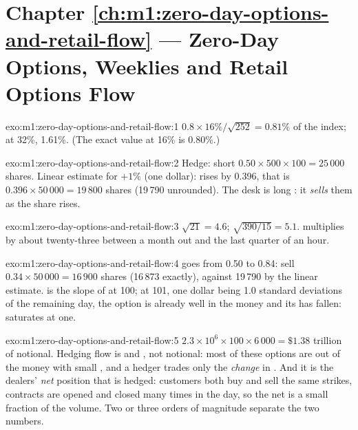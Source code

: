 \section*{Chapter \ref{ch:m1:zero-day-options-and-retail-flow} --- Zero-Day Options, Weeklies and Retail Options Flow}

\begin{solution}{exo:m1:zero-day-options-and-retail-flow:1}
$0.8 \times 16\%/\sqrt{252} = 0.81\%$ of the index; at 32\%, 1.61\%. (The exact
value at 16\% is 0.80\%.)
\end{solution}

\begin{solution}{exo:m1:zero-day-options-and-retail-flow:2}
Hedge: short $0.50 \times 500 \times 100 = 25\,000$ shares. Linear estimate for
$+1\%$ (one dollar):  rises by 0.396, that is $0.396 \times 50\,000 =
19\,800$ shares (19\,790 unrounded). The desk is long : it \emph{sells}
them as the share rises.
\end{solution}

\begin{solution}{exo:m1:zero-day-options-and-retail-flow:3}
$\sqrt{21} = 4.6$; $\sqrt{390/15} = 5.1$.  multiplies by about twenty-three
between a month out and the last quarter of an hour.
\end{solution}

\begin{solution}{exo:m1:zero-day-options-and-retail-flow:4}
 goes from 0.50 to 0.84: sell $0.34 \times 50\,000 = 16\,900$ shares
(16\,873 exactly), against 19\,790 by the linear estimate.  is the slope
of  at 100; at 101, one dollar being 1.0 standard deviations of the
remaining day, the option is already well in the money and its  has
fallen:  saturates at one.
\end{solution}

\begin{solution}{exo:m1:zero-day-options-and-retail-flow:5}
$2.3 \times 10^6 \times 100 \times 6\,000 = \$1.38$ trillion of notional. Hedging
flow is  and , not notional: most of these options are out of the
money with small , and a hedger trades only the \emph{change} in .
And it is the dealers' \emph{net} position that is hedged: customers both buy
and sell the same strikes, contracts are opened and closed many times in the
day, so the net is a small fraction of the volume. Two or three orders of
magnitude separate the two numbers.
\end{solution}

